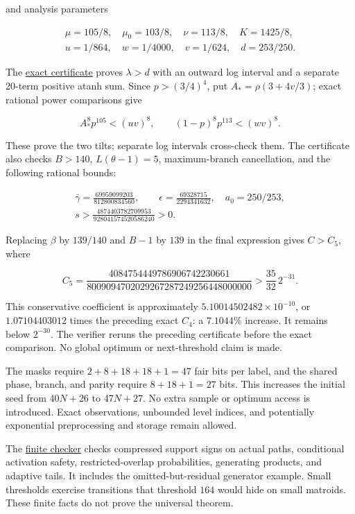 \documentclass[11pt]{article}
\begin{document}
and analysis parameters

\[\begin{gathered}
\mu=105/8,\quad\mu_0=103/8,\quad\nu=113/8,\quad K=1425/8,\\
u=1/864,\quad w=1/4000,\quad v=1/624,\quad d=253/250.
\end{gathered}\]

The \href{https://github.com/shea256/matroid-prophet-inequality/blob/master/verification/certify_support_refinement.py}{exact certificate} proves \(\lambda>d\) with an outward log interval and a separate 20-term positive atanh sum. Since \(p>(3/4)^4\), put \(A_*=\rho(3+4v/3)\); exact rational power comparisons give

\[A_*^8p^{105}<(uv)^8,\qquad (1-p)^8p^{113}<(wv)^8.\]

These prove the two tilts; separate log intervals cross-check them. The certificate also checks \(B>140\), \(L(\theta-1)=5\), maximum-branch cancellation, and the following rational bounds:

\[\begin{gathered}
\bar\gamma=\frac{69959099203}{812800834560},\qquad
\epsilon=\frac{69328715}{2294341632},\quad a_0=250/253,\\
s>\frac{4874403782709953}{928041574520586240}>0.
\end{gathered}\]

Replacing \(\beta\) by \(139/140\) and \(B-1\) by \(139\) in the final expression gives \(C>C_5\), where

\[C_5=\frac{4084754449786906742230661}
{8009094702029267287249256448000000}
>\frac{35}{32}\,2^{-31}.\]

This conservative coefficient is approximately \(5.10014502482\times10^{-10}\), or \(1.07104403012\) times the preceding exact \(C_4\): a \(7.1044\%\) increase. It remains below \(2^{-30}\). The verifier reruns the preceding certificate before the exact comparison. No global optimum or next-threshold claim is made.

The masks require \(2+8+18+18+1=47\) fair bits per label, and the shared phase, branch, and parity require \(8+18+1=27\) bits. This increases the initial seed from \(40N+26\) to \(47N+27\). No extra sample or optimum access is introduced. Exact observations, unbounded level indices, and potentially exponential preprocessing and storage remain allowed.

The \href{https://github.com/shea256/matroid-prophet-inequality/blob/master/verification/check_support_refinement.py}{finite checker} checks compressed support signs on actual paths, conditional activation safety, restricted-overlap probabilities, generating products, and adaptive tails. It includes the omitted-but-residual generator example. Small thresholds exercise transitions that threshold \(164\) would hide on small matroids. These finite facts do not prove the universal theorem.
\end{document}
